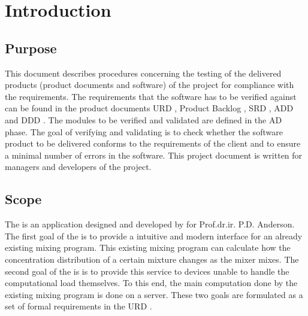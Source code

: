 \chapter{Introduction}

\section{Purpose}
   This document describes procedures concerning the testing of the delivered products (product
   documents and software) of the \projectname{} project for compliance with the requirements. The
   requirements that the software has to be verified against can be found in the product documents
   URD \cite{urd}, Product Backlog \cite{backlog}, SRD \cite{srd}, ADD \cite{add} and DDD \cite{ddd}. The modules to be verified and validated are defined
   in the AD phase. The goal of verifying and validating is to check whether the software product to
   be delivered conforms to the requirements of the client and to ensure a minimal number of errors
   in the software. This project document is written for managers and developers of the \projectname{}
   project.

\section{Scope}
The \applicationname{} is an application designed and developed by \projectauthor{} for Prof.dr.ir. P.D. Anderson. The first goal of the \applicationname{} is to provide a intuitive and modern interface for an already existing mixing program. This existing mixing program can calculate how the concentration distribution of a certain mixture changes as the mixer mixes. The second goal of the \applicationname{} is is to provide this service to devices unable to handle the computational load themselves. To this end, the main computation done by the existing mixing program is done on a server. These two goals are formulated as a set of formal requirements in the  URD \cite{urd}.

